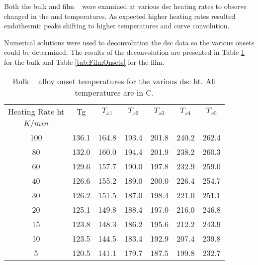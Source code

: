 \documentclass[draft,a4paper,12pt,oneside]{article}%
\begin{document}
Both the bulk and film \MgZnCa~ were examined at various \acrshort{dsc} heating rates to observe changed in the \Tg and \Tx temperatures. As expected higher heating rates resulted endothermic peaks shifting to higher temperatures and curve convolution. 

Numerical solutions were used to deconvolution the \acrshort{dsc} data so the various \Tx onsets could be determined. The results of the deconvolution are presented in Table \ref{tab:BulkOnsets} for the bulk and Table \ref{tab:FilmOnsets} for the film.

\begin{table}[h]
	\centering
	\begin{tabular}{ c c c c c c c }
		\toprule
		Heating Rate \acrshort{ht} & \acrshort{Tg} & $T_{x1}$ & $T_{x2}$ & $T_{x3}$ & $T_{x4}$ & $T_{x5}$ \\ 
		$K/min$ & & & & & & \\
		\midrule
		100 & 136.1 & 164.8 & 193.4 & 201.8 & 240.2 & 262.4 \\
		80  & 132.0 & 160.0 & 194.4 & 201.9 & 238.2 & 260.3 \\
		60  & 129.6 & 157.7 & 190.0 & 197.8 & 232.9 & 259.0 \\
		40  & 126.6 & 155.2 & 189.0 & 200.0 & 226.4 & 254.7 \\
		30  & 126.2 & 151.5 & 187.0 & 198.4 & 221.0 & 251.1 \\
		20  & 125.1 & 149.8 & 188.4 & 197.0 & 216.0 & 246.8 \\
		15  & 123.8 & 148.3 & 186.2 & 195.6 & 212.2 & 243.9 \\
		10  & 123.5 & 144.5 & 183.4 & 192.9 & 207.4 & 239.8 \\
		5   & 120.5 & 141.1 & 179.7 & 187.5 & 199.8 & 232.7 \\ 
		\bottomrule
	\end{tabular}
	\caption{Bulk \MgZnCa~ alloy onset temperatures for the various \acrshort{dsc}  \acrshort{ht}. All temperatures are in \degree C.}
	\label{tab:BulkOnsets}
\end{table}
\end{document}
